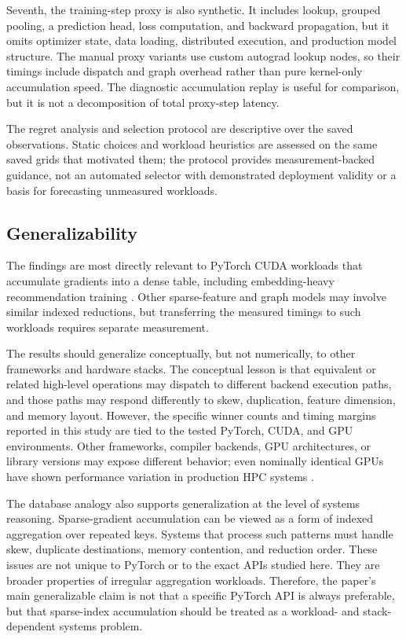 Seventh, the training-step proxy is also synthetic. It includes lookup, grouped pooling, a prediction head, loss computation, and backward propagation, but it omits optimizer state, data loading, distributed execution, and production model structure. The manual proxy variants use custom autograd lookup nodes, so their timings include dispatch and graph overhead rather than pure kernel-only accumulation speed. The diagnostic accumulation replay is useful for comparison, but it is not a decomposition of total proxy-step latency.

The regret analysis and selection protocol are descriptive over the saved observations. Static choices and workload heuristics are assessed on the same saved grids that motivated them; the protocol provides measurement-backed guidance, not an automated selector with demonstrated deployment validity or a basis for forecasting unmeasured workloads.

\subsection{Generalizability}

The findings are most directly relevant to PyTorch CUDA workloads that accumulate gradients into a dense table, including embedding-heavy recommendation training \citep{acun2021training}. Other sparse-feature and graph models may involve similar indexed reductions, but transferring the measured timings to such workloads requires separate measurement.

The results should generalize conceptually, but not numerically, to other frameworks and hardware stacks. The conceptual lesson is that equivalent or related high-level operations may dispatch to different backend execution paths, and those paths may respond differently to skew, duplication, feature dimension, and memory layout. However, the specific winner counts and timing margins reported in this study are tied to the tested PyTorch, CUDA, and GPU environments. Other frameworks, compiler backends, GPU architectures, or library versions may expose different behavior; even nominally identical GPUs have shown performance variation in production HPC systems \citep{sinha2022variability}.

The database analogy also supports generalization at the level of systems reasoning. Sparse-gradient accumulation can be viewed as a form of indexed aggregation over repeated keys. Systems that process such patterns must handle skew, duplicate destinations, memory contention, and reduction order. These issues are not unique to PyTorch or to the exact APIs studied here. They are broader properties of irregular aggregation workloads. Therefore, the paper's main generalizable claim is not that a specific PyTorch API is always preferable, but that sparse-index accumulation should be treated as a workload- and stack-dependent systems problem.

